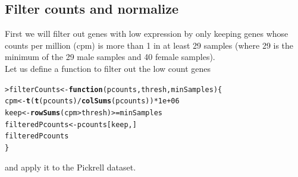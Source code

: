 \documentclass[a4paper, 10pt]{article}\usepackage[]{graphicx}\usepackage[]{color}
\makeatletter
\newcommand{\hlnum}[1]{\textcolor[rgb]{0.686,0.059,0.569}{#1}}%
\newcommand{\hlopt}[1]{\textcolor[rgb]{0,0,0}{#1}}%
\newcommand{\hlstd}[1]{\textcolor[rgb]{0.345,0.345,0.345}{#1}}%
\newcommand{\hlkwa}[1]{\textcolor[rgb]{0.161,0.373,0.58}{\textbf{#1}}}%
\newcommand{\hlkwb}[1]{\textcolor[rgb]{0.69,0.353,0.396}{#1}}%
\newcommand{\hlkwc}[1]{\textcolor[rgb]{0.333,0.667,0.333}{#1}}%
\newcommand{\hlkwd}[1]{\textcolor[rgb]{0.737,0.353,0.396}{\textbf{#1}}}%
\newenvironment{kframe}{%
 \def\at@end@of@kframe{}%
 \ifinner\ifhmode%
  \def\at@end@of@kframe{\end{minipage}}%
  \begin{minipage}{\columnwidth}%
 \fi\fi%
 \def\FrameCommand##1{\hskip\@totalleftmargin \hskip-\fboxsep
 \colorbox{shadecolor}{##1}\hskip-\fboxsep
     \hskip-\linewidth \hskip-\@totalleftmargin \hskip\columnwidth}%
 \MakeFramed {\advance\hsize-\width
   \@totalleftmargin\z@ \linewidth\hsize
   \@setminipage}}%
 {\par\unskip\endMakeFramed%
 \at@end@of@kframe}
\newenvironment{knitrout}{}{} %
\makeatother
\begin{document}
\subsection{Filter counts and normalize}

First we will filter out genes with low 
expression by only keeping genes whose
counts per million (cpm) is more than 1 in 
at least 29 samples (where 29 is the minimum of
the 29 male samples and 40 female samples).\\

\noindent Let us define a function to filter
out the low count genes

\begin{knitrout}\small
{}\color{fgcolor}\begin{kframe}
\begin{alltt}
\hlstd{> }\hlstd{filterCounts} \hlkwb{<-} \hlkwa{function} \hlstd{(}\hlkwc{pcounts}\hlstd{,} \hlkwc{thresh}\hlstd{,} \hlkwc{minSamples}\hlstd{) \{}
\hlstd{ }  \hlstd{cpm} \hlkwb{<-} \hlkwd{t}\hlstd{(}\hlkwd{t}\hlstd{(pcounts)} \hlopt{/}  \hlkwd{colSums}\hlstd{(pcounts))} \hlopt{*} \hlnum{1e+06}
\hlstd{ }  \hlstd{keep} \hlkwb{<-} \hlkwd{rowSums}\hlstd{(cpm} \hlopt{>} \hlstd{thresh)} \hlopt{>=} \hlstd{minSamples}
\hlstd{ }  \hlstd{filteredPcounts} \hlkwb{<-} \hlstd{pcounts[keep, ]}
\hlstd{ }  \hlstd{filteredPcounts}
\hlstd{ }\hlstd{\}}
\end{alltt}
\end{kframe}
\end{knitrout}

\noindent and apply it to the Pickrell dataset.
\end{document}
